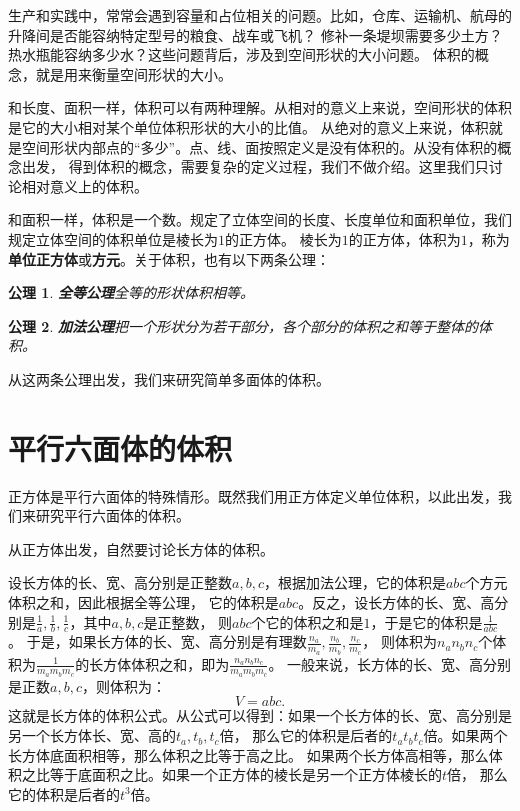 \documentclass[12pt,UTF8]{ctexbook}
\newtheorem{po}{公理}
\begin{document}
生产和实践中，常常会遇到容量和占位相关的问题。比如，仓库、运输机、航母的升降间是否能容纳特定型号的粮食、战车或飞机？
修补一条堤坝需要多少土方？热水瓶能容纳多少水？这些问题背后，涉及到空间形状的大小问题。
体积的概念，就是用来衡量空间形状的大小。

和长度、面积一样，体积可以有两种理解。从相对的意义上来说，空间形状的体积是它的大小相对某个单位体积形状的大小的比值。
从绝对的意义上来说，体积就是空间形状内部点的“多少”。点、线、面按照定义是没有体积的。从没有体积的概念出发，
得到体积的概念，需要复杂的定义过程，我们不做介绍。这里我们只讨论相对意义上的体积。

和面积一样，体积是一个数。规定了立体空间的长度、长度单位和面积单位，我们规定立体空间的体积单位是棱长为$1$的正方体。
棱长为$1$的正方体，体积为$1$，称为\textbf{单位正方体}或\textbf{方元}。关于体积，也有以下两条公理：
\begin{po}{\textbf{全等公理}}\label{po:4}
    全等的形状体积相等。
\end{po}
\begin{po}{\textbf{加法公理}}\label{po:5}
    把一个形状分为若干部分，各个部分的体积之和等于整体的体积。
\end{po}
从这两条公理出发，我们来研究简单多面体的体积。

\section{平行六面体的体积}

正方体是平行六面体的特殊情形。既然我们用正方体定义单位体积，以此出发，我们来研究平行六面体的体积。

从正方体出发，自然要讨论长方体的体积。

设长方体的长、宽、高分别是正整数$a,b,c$，根据加法公理，它的体积是$abc$个方元体积之和，因此根据全等公理，
它的体积是$abc$。反之，设长方体的长、宽、高分别是$\frac{1}{a},\frac{1}{b},\frac{1}{c}$，其中$a,b,c$是正整数，
则$abc$个它的体积之和是$1$，于是它的体积是$\frac{1}{abc}$。
于是，如果长方体的长、宽、高分别是有理数$\frac{n_a}{m_a},\frac{n_b}{m_b},\frac{n_c}{m_c}$，
则体积为$n_an_bn_c$个体积为$\frac{1}{m_am_bm_c}$的长方体体积之和，即为$\frac{n_an_bn_c}{m_am_bm_c}$。
一般来说，长方体的长、宽、高分别是正数$a,b,c$，则体积为：
$$ V = abc.$$
这就是长方体的体积公式。从公式可以得到：如果一个长方体的长、宽、高分别是另一个长方体长、宽、高的$t_a,t_b,t_c$倍，
那么它的体积是后者的$t_at_bt_c$倍。如果两个长方体底面积相等，那么体积之比等于高之比。
如果两个长方体高相等，那么体积之比等于底面积之比。如果一个正方体的棱长是另一个正方体棱长的$t$倍，
那么它的体积是后者的$t^3$倍。
\end{document}

